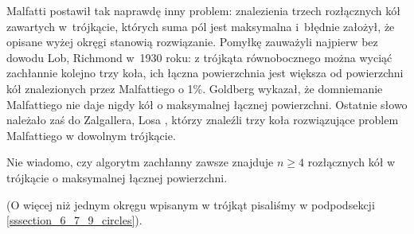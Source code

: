 Malfatti postawił tak naprawdę inny problem: znalezienia trzech rozłącznych kół zawartych w~trójkącie, których suma pól jest maksymalna i~błędnie założył, że opisane wyżej okręgi stanowią rozwiązanie.
Pomyłkę zauważyli najpierw bez dowodu Lob, Richmond \cite{lob_richmond_1930} w~1930 roku: z trójkąta równobocznego można wyciąć zachłannie kolejno trzy koła, ich łączna powierzchnia jest większa od powierzchni kół znalezionych przez Malfattiego o 1\%.
%
%
Goldberg \cite{goldberg_1967} wykazał, że domniemanie Malfattiego nie daje nigdy kół o maksymalnej łącznej powierzchni.
Ostatnie słowo należało zaś do Zalgallera, Losa \cite{zalgaller_los_1992}, którzy znaleźli trzy koła rozwiązujące problem Malfattiego w dowolnym trójkącie.
%
%

Nie wiadomo, czy algorytm zachłanny zawsze znajduje $n \ge 4$ rozłącznych kół w trójkącie o maksymalnej łącznej powierzchni.

(O więcej niż jednym okręgu wpisanym w trójkąt pisaliśmy w podpodsekcji \ref{sssection_6_7_9_circles}).
